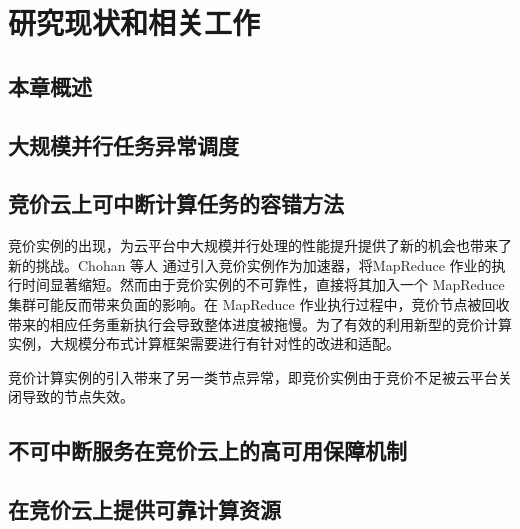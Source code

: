 \chapter{研究现状和相关工作}
\label{cha:background}

\section{本章概述}

\section{大规模并行任务异常调度}

\section{竞价云上可中断计算任务的容错方法}
竞价实例的出现，为云平台中大规模并行处理的性能提升提供了新的机会也带来了新的挑战。Chohan 等人 \cite{chohan2010see} 通过引入竞价实例作为加速器，将MapReduce 作业的执行时间显著缩短。然而由于竞价实例的不可靠性，直接将其加入一个 MapReduce 集群可能反而带来负面的影响。在 MapReduce 作业执行过程中，竞价节点被回收带来的相应任务重新执行会导致整体进度被拖慢。为了有效的利用新型的竞价计算实例，大规模分布式计算框架需要进行有针对性的改进和适配。

竞价计算实例的引入带来了另一类节点异常，即竞价实例由于竞价不足被云平台关闭导致的节点失效。

\section{不可中断服务在竞价云上的高可用保障机制}

\section{在竞价云上提供可靠计算资源}
